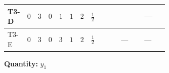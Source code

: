 \documentclass[8pt]{article}
\begin{document}
\begin{landscape}
\begin{longtable}{@{}llcccccc >{\raggedright\arraybackslash}p{0.21\linewidth} >{\raggedright\arraybackslash}p{0.21\linewidth} >{\raggedright\arraybackslash}p{0.21\linewidth}@{}}
\midrule
T3-D & $0$ & $3$ & $0$ & $1$ & $1$ & $2$ & $\frac{1}{2}$ & \scriptsize\adjustbox{max width=\linewidth}{$\begin{gathered} T_{\nu}^{(1)} \left({y_1}\right)_{ij}\end{gathered}$} & \scriptsize\adjustbox{max width=\linewidth}{$\begin{gathered} +\frac{1}{2} (\left({y_2}\,\left({y_2}\right)^{\dagger}\,{y_1}\right)_{ij}+\left({Y_e}\,\left({Y_e}\right)^{\dagger}\,{y_1}\right)_{ij}+3 \left({y_1}\,\left({y_1}\right)^{\dagger}\,{y_1}\right)_{ij})\end{gathered}$} & --- \\
\midrule
T3-E & $0$ & $3$ & $0$ & $3$ & $1$ & $2$ & $\frac{1}{2}$ & \scriptsize\adjustbox{max width=\linewidth}{$\begin{gathered} T_{\nu}^{(1)} \left({y_1}\right)_{ij}\end{gathered}$} & --- & --- \\
\midrule
\bottomrule
\end{longtable}
\clearpage
\noindent\textbf{Quantity: }$y_1$\par\smallskip

\end{landscape}
\end{document}
